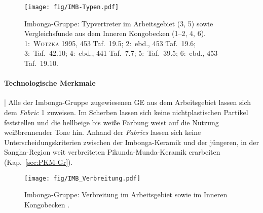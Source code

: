 \begin{figure*}[tb]
	\begin{minipage}[b]{.8\textwidth}
		\texttt{[image: fig/IMB-Typen.pdf]}
	\end{minipage}\hfill
	\begin{minipage}[b]{.2\textwidth}
		\caption{Imbonga-Gruppe: Typvertreter im Arbeitsgebiet (3, 5) sowie Vergleichsfunde aus dem Inneren Kongobecken (1--2, 4, 6).\\1:~\textsc{Wotzka} 1995, 453 Taf.~19.5; 2:~ebd., 453 Taf.~19.6; 3:~Taf.~42.10; 4:~ebd., 441 Taf.~7.7; 5:~Taf.~39.5; 6:~ebd., 453 Taf.~19.10.}
		\label{fig:IMB_Typentafel}
	\end{minipage}
\end{figure*}

\paragraph{Technologische Merkmale}\hspace{-.5em}|\hspace{.5em}%
Alle der Imbonga-Gruppe zugewiesenen GE aus dem Arbeitsgebiet lassen sich dem \textit{Fabric} 1 zuweisen. Im Scherben lassen sich keine nichtplastischen Partikel feststellen und die hellbeige bis weiße Färbung weist auf die Nutzung weißbrennender Tone hin. Anhand der \textit{Fabrics} lassen sich keine Unterscheidungskriterien zwischen der Imbonga-Keramik und der jüngeren, in der \mbox{Sangha}-Region weit verbreiteten Pikunda-Munda-Keramik erarbeiten (Kap.~\ref{sec:PKM-Gr}).

\begin{figure*}[p]
	\centering
	\texttt{[image: fig/IMB\_Verbreitung.pdf]}
	\caption{Imbonga-Gruppe: Verbreitung im Arbeitsgebiet sowie im Inneren Kongobecken \parencite[grau nach][544--545 Karte 2]{Wotzka.1995}.}
	\label{fig:IMB_Verbreitung}
\end{figure*}

